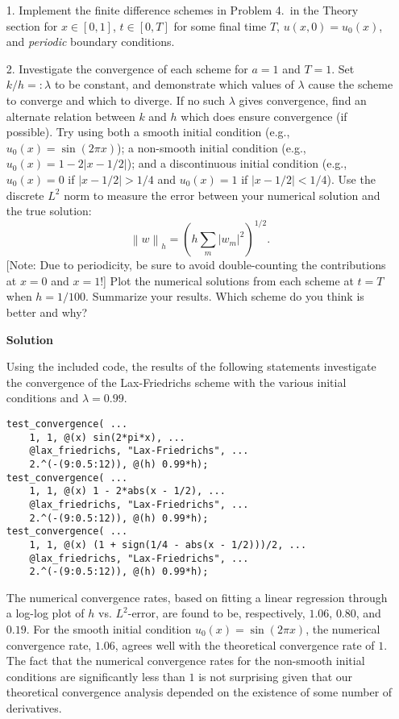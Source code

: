 \documentclass{article}
\providecommand{\abs}[1]{\left\lvert#1\right\rvert}
\providecommand{\norm}[1]{\left\lVert#1\right\rVert}
\begin{document}
\begin{itemize}

\item[1.] Implement the finite difference schemes in Problem 4.\ in the Theory section for $x \in [0,1]$, $t \in [0,T]$ for some final time $T$, $u(x,0) = u_0(x)$, and \emph{periodic} boundary conditions.

\item[2.] Investigate the convergence of each scheme for $a = 1$ and $T = 1$. Set $k/h =: \lambda$ to be constant, and demonstrate which values of $\lambda$ cause the scheme to converge and which to diverge. If no such $\lambda$ gives convergence, find an alternate relation between $k$ and $h$ which does ensure convergence (if possible). Try using both a smooth initial condition (e.g., $u_0(x) = \sin(2 \pi x)$); a non-smooth initial condition (e.g., $u_0(x) = 1 - 2 \abs{x - 1/2}$); and a discontinuous initial condition (e.g., $u_0(x) = 0$ if $\abs{x - 1/2} > 1/4$ and $u_0(x) = 1$ if $\abs{x - 1/2} < 1/4$). Use the discrete $L^2$ norm to measure the error between your numerical solution and the true solution:
\begin{equation*}
\norm{w}_h = \left( h \sum_m \abs{w_m}^2 \right)^{1/2}.
\end{equation*}
[Note: Due to periodicity, be sure to avoid double-counting the contributions at $x = 0$ and $x = 1$!] Plot the numerical solutions from each scheme at $t = T$ when $h = 1/100$. Summarize your results. Which scheme do you think is better and why?

\textbf{Solution}

Using the included code, the results of the following statements investigate the convergence of the Lax-Friedrichs scheme with the various initial conditions and $\lambda = 0.99$.

\begin{verbatim}
test_convergence( ...
    1, 1, @(x) sin(2*pi*x), ...
    @lax_friedrichs, "Lax-Friedrichs", ...
    2.^(-(9:0.5:12)), @(h) 0.99*h);
test_convergence( ...
    1, 1, @(x) 1 - 2*abs(x - 1/2), ...
    @lax_friedrichs, "Lax-Friedrichs", ...
    2.^(-(9:0.5:12)), @(h) 0.99*h);
test_convergence( ...
    1, 1, @(x) (1 + sign(1/4 - abs(x - 1/2)))/2, ...
    @lax_friedrichs, "Lax-Friedrichs", ...
    2.^(-(9:0.5:12)), @(h) 0.99*h);
\end{verbatim}

The numerical convergence rates, based on fitting a linear regression through a log-log plot of $h$ vs. $L^2$-error, are found to be, respectively, $1.06$, $0.80$, and $0.19$. For the smooth initial condition $u_0(x) = \sin(2 \pi x)$, the numerical convergence rate, $1.06$, agrees well with the theoretical convergence rate of $1$. The fact that the numerical convergence rates for the non-smooth initial conditions are significantly less than $1$ is not surprising given that our theoretical convergence analysis depended on the existence of some number of derivatives.


\end{itemize}
\end{document}
